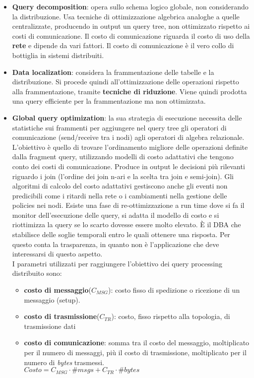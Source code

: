 \begin{itemize}
    \item \textbf{Query decomposition}: opera sullo schema logico globale, non considerando la distribuzione. Usa tecniche di ottimizzazione algebrica analoghe a quelle centralizzate, producendo in output un query tree, non ottimizzato rispetto ai costi di comunicazione. Il costo di comunicazione riguarda il costo di uso della \textbf{rete} e dipende da vari fattori. Il costo di comunicazione è il vero collo di bottiglia in sistemi distribuiti.
    \item \textbf{Data localization}: considera la frammentazione delle tabelle e la distribuzione. Si procede quindi all'ottimizzazione delle operazioni rispetto alla frammentazione, tramite \textbf{tecniche di riduzione}. Viene quindi prodotta una query efficiente per la frammentazione ma non ottimizzata.
    \item \textbf{Global query optimization}: la sua strategia di esecuzione necessita delle statistiche sui frammenti per aggiungere nel query tree gli operatori di comunicazione (send/receive tra i nodi) agli operatori di algebra relazionale. L’obiettivo è quello di trovare l’ordinamento migliore delle operazioni definite dalla fragment query, utilizzando modelli di costo adattativi che tengono conto dei costi di comunicazione. Produce in output le decisioni più rilevanti riguardo i join (l’ordine dei join n-ari e la scelta tra join e semi-join). Gli algoritmi di calcolo del costo adattativi gestiscono anche gli eventi non predicibili come i ritardi nella rete o i cambiamenti nella gestione delle policies nei nodi. Esiste una fase di re-ottimizzazione a run time dove si fa il monitor dell’esecuzione delle query, si adatta il modello di costo e si riottimizza la query se lo scarto dovesse essere molto elevato. È il DBA che stabilisce delle soglie temporali entro le quali ottenere una risposta. Per questo conta la trasparenza, in quanto non è l'applicazione che deve interessarsi di questo aspetto. \\
    I parametri utilizzati per raggiungere l'obiettivo dei query processing distribuito sono:
    \begin{itemize} 
        \item \textbf{costo di messaggio}($C_{MSG}$): costo fisso di spedizione o ricezione di un messaggio (setup). 
        \item \textbf{costo di trasmissione}($C_{TR}$): costo, fisso rispetto alla topologia, di trasmissione dati 
        \item \textbf{costo di comunicazione}: somma tra il costo del messaggio, moltiplicato per il numero di messaggi, più il costo di trasmissione, moltiplicato per il numero di \textit{bytes} trasmessi.\\ $Costo = C_{MSG} \cdot \#msgs + C_{TR} \cdot \#bytes$

\end{itemize}
\end{itemize}
